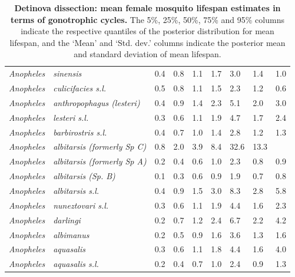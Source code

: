 \documentclass[12pt]{article}
\begin{document}
\begin{table}[htbp!]
\begin{tabular}{l|l|l|l|l|l|l|l|l}
	\textit{Anopheles} & \textit{sinensis} & 0.4 & 0.8 & 1.1 & 1.7 & 3.0 & 1.4 & 1.0 \\
	\textit{Anopheles} & \textit{culicifacies s.l.} & 0.5 & 0.8 & 1.1 & 1.5 & 2.3 & 1.2 & 0.6 \\
	\textit{Anopheles} & \textit{anthropophagus (lesteri)} & 0.4 & 0.9 & 1.4 & 2.3 & 5.1 & 2.0 &
	3.0 \\
	\textit{Anopheles} & \textit{lesteri s.l.} & 0.3 & 0.6 & 1.1 & 1.9 & 4.7 & 1.7 & 2.4 \\
	\textit{Anopheles} & \textit{barbirostris s.l.} & 0.4 & 0.7 & 1.0 & 1.4 & 2.8 & 1.2 & 1.3 \\
	\textit{Anopheles} & \textit{albitarsis (formerly Sp C)} & 0.8 & 2.0 & 3.9 & 8.4 &
	32.6 & 13.3 & \text{$>$100} \\
	\textit{Anopheles} & \textit{albitarsis (formerly Sp A)} & 0.2 & 0.4 & 0.6 & 1.0 & 2.3 & 0.8
	& 0.9 \\
	\textit{Anopheles} & \textit{albitarsis (Sp. B)} & 0.1 & 0.3 & 0.6 & 0.9 & 1.9 & 0.7 & 0.8
	\\
	\textit{Anopheles} & \textit{albitarsis s.l.} & 0.4 & 0.9 & 1.5 & 3.0 & 8.3 & 2.8 & 5.8 \\
	\textit{Anopheles} & \textit{nuneztovari s.l.} & 0.3 & 0.6 & 1.1 & 1.9 & 4.4 & 1.6 & 2.3 \\
	\textit{Anopheles} & \textit{darlingi} & 0.2 & 0.7 & 1.2 & 2.4 & 6.7 & 2.2 & 4.2 \\
	\textit{Anopheles} & \textit{albimanus} & 0.2 & 0.5 & 0.9 & 1.6 & 3.6 & 1.3 & 1.6 \\
	\textit{Anopheles} & \textit{aquasalis} & 0.3 & 0.6 & 1.1 & 1.8 & 4.4 & 1.6 & 4.0 \\
	\textit{Anopheles} & \textit{aquasalis s.l.} & 0.2 & 0.4 & 0.7 & 1.0 & 2.4 & 0.9 & 1.3 \\
\end{tabular}
\caption{\textbf{Detinova dissection: mean female mosquito lifespan estimates in terms of gonotrophic cycles.} The 5\%, 25\%, 50\%, 75\% and 95\% columns indicate the respective quantiles of the posterior distribution for mean lifespan, and the `Mean' and `Std. dev.' columns indicate the posterior mean and standard deviation of mean lifespan.}
\label{tab:detinova_lifespan_gonotrophic}%
\end{table}
\end{document}
